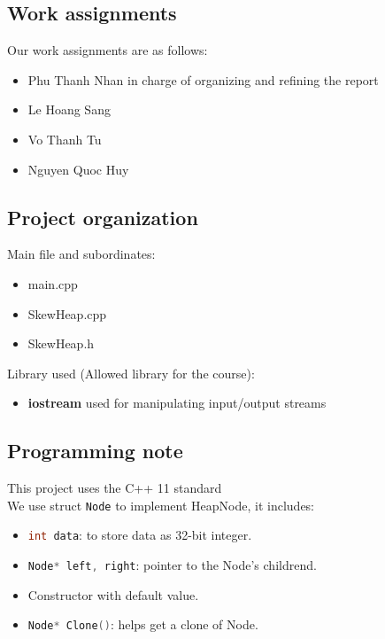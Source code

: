 \documentclass[12pt, a4paper]{article}
\newcommand{\code}[1]{\lstinline[language=C++, basicstyle=\color{orange!40!black}\ttfamily,morekeywords={cout,endl,\&,string},
keywordstyle=\color{blue},
commentstyle=\color{green!50!black},]{#1}}
\begin{document}
\subsection{Work assignments}
Our work assignments are as follows:
\begin{itemize}
    \item Phu Thanh Nhan in charge of organizing and refining the report
    \item Le Hoang Sang
    \item Vo Thanh Tu
    \item Nguyen Quoc Huy
\end{itemize}
\subsection{Project organization}

Main file and subordinates:

\begin{itemize}
    \item main.cpp
    \item SkewHeap.cpp
    \item SkewHeap.h
\end{itemize}

\noindent Library used (Allowed library for the course):

\begin{itemize}
    \item \textbf{iostream} used for manipulating input/output streams
\end{itemize}
\newpage
\subsection{Programming note}
This project uses the C++ 11 standard\\

We use struct \code{Node} to implement HeapNode, it includes:
\begin{itemize}
    \item \code{int data}: to store data as 32-bit integer.
    \item \code{Node* left, right}: pointer to the Node's childrend.
    \item Constructor with default value.
    \item \code{Node* Clone()}: helps get a clone of Node.
\end{itemize}
\end{document}
